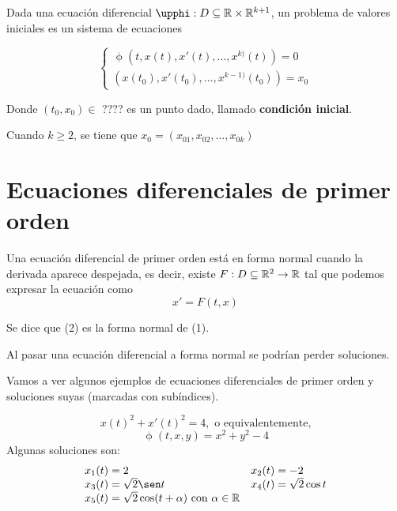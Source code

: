 \begin{ndef}
  Dada una ecuación diferencial $\upphi:D \subseteq \R\times\R^{k+1}$, un problema de valores iniciales es un sistema de ecuaciones

  \[
  \begin{cases}
    \upphi\left(t, x(t), x'(t), \dots, x^{k)}(t)\right) = 0 \\
    \left(x(t_0),x'(t_0),\dots,x^{k-1)}(t_0)\right) = x_0
  \end{cases}
  \]

  Donde $(t_0,x_0) \in$ ???? es un punto dado, llamado \textbf{condición inicial}.
\end{ndef}

\begin{nota} Cuando $k\ge2$, se tiene que $x_0=(x_{01},x_{02},\dots,x_{0k})$
	
\end{nota}

\section{Ecuaciones diferenciales de primer orden}

\begin{ndef}
Una ecuación diferencial de primer orden está en forma normal cuando la derivada aparece despejada, es decir, existe $F : D\subseteq \mathbb{R}^2 \to \mathbb{R}$ tal que podemos expresar la ecuación como
  \[
    x' = F\left(t,x\right)
  \]

  Se dice que (2) es la forma normal de (1).
  
\end{ndef}

\begin{nota} Al pasar una ecuación diferencial a forma normal se podrían perder soluciones.
	
\end{nota}

Vamos a ver algunos ejemplos de ecuaciones diferenciales de primer orden y soluciones suyas (marcadas con subíndices).

\begin{ejemplo}
\[x(t)^2 + x'(t)^2 = 4, \text{ o equivalentemente,} \]
\[ \upphi(t,x,y) = x^2+y^2 -4\]
Algunas soluciones son:
\[ 
\begin{array}{ll}
  x_1(t) = 2 & x_2(t) = -2 \\
  x_3(t) = \sqrt{2}\sen t & x_4(t) = \sqrt{2}\cos t \\
  x_5(t) = \sqrt{2}\cos(t+\alpha) \text{ con } \alpha\in\R
\end{array}
\]
\end{ejemplo}

